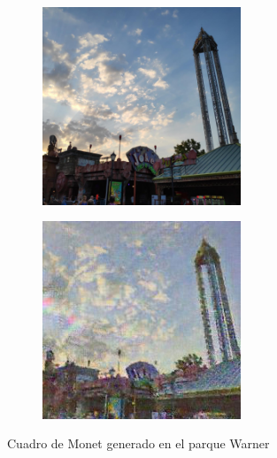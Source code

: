 \documentclass[[../main.tex]{subfiles}
\begin{document}
        \begin{figure}[!htb]
            \begin{subfigure}[b]{0.49\textwidth}
            \includegraphics[width=0.65\textwidth]{imagenes/imagen2cuadro/propias/monet/IMG_20190903_200509.jpg}
            \end{subfigure}
        \hfill
            \begin{subfigure}[b]{0.49\textwidth}
\includegraphics[width=0.65\textwidth]{imagenes/imagen2cuadro/propias/monet/IMG_20190903_200509_2.jpg}
            \end{subfigure}
        \caption{Cuadro de Monet generado en el parque Warner}
        \label{fig:monet_cuadro_warner}
        \end{figure}
        
\end{document}
